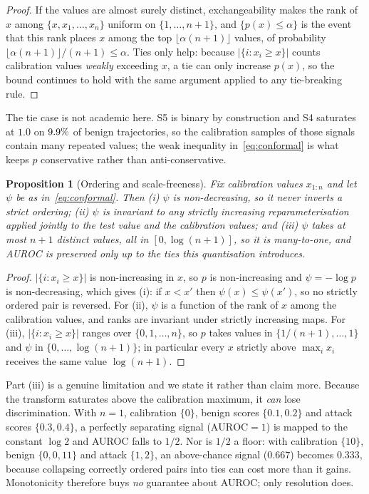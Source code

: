 \documentclass[pdflatex,sn-basic]{sn-jnl}%
\theoremstyle{thmstyleone}
\newtheorem{proposition}[theorem]{Proposition}
\theoremstyle{thmstyletwo}
\theoremstyle{thmstylethree}
\begin{document}
\begin{proof}
If the values are almost surely distinct, exchangeability makes the rank of $x$
among $\{x, x_1, \dots, x_n\}$ uniform on $\{1,\dots,n+1\}$, and
$\{p(x) \le \alpha\}$ is the event that this rank places $x$ among the top
$\lfloor \alpha (n+1) \rfloor$ values, of probability
$\lfloor \alpha(n+1)\rfloor/(n+1) \le \alpha$. Ties only help: because
$|\{i : x_i \ge x\}|$ counts calibration values \emph{weakly} exceeding $x$, a tie
can only increase $p(x)$, so the bound continues to hold with the same argument
applied to any tie-breaking rule.
\end{proof}

The tie case is not academic here. S5 is binary by construction and S4 saturates
at $1.0$ on $9.9\%$ of benign trajectories, so the calibration samples of those
signals contain many repeated values; the weak inequality in~\eqref{eq:conformal}
is what keeps $p$ conservative rather than anti-conservative.

\begin{proposition}[Ordering and scale-freeness]\label{prop:mono}
Fix calibration values $x_{1:n}$ and let $\psi$ be as in~\eqref{eq:conformal}.
Then (i) $\psi$ is non-decreasing, so it never inverts a strict ordering;
(ii) $\psi$ is invariant to any strictly increasing reparameterisation applied
jointly to the test value and the calibration values; and (iii) $\psi$ takes at most $n+1$ distinct values, all in
$[0, \log(n+1)]$, so it is many-to-one, and AUROC is preserved only up to the
ties this quantisation introduces.
\end{proposition}

\begin{proof}
$|\{i : x_i \ge x\}|$ is non-increasing in $x$, so $p$ is non-increasing and
$\psi = -\log p$ is non-decreasing, which gives (i): if $x < x'$ then
$\psi(x) \le \psi(x')$, so no strictly ordered pair is reversed.
For (ii), $\psi$ is a function of the rank of $x$ among the calibration values,
and ranks are invariant under strictly increasing maps. For (iii),
$|\{i : x_i \ge x\}|$ ranges over $\{0,1,\dots,n\}$, so $p$ takes values in
$\{1/(n{+}1), \dots, 1\}$ and $\psi$ in $\{0, \dots, \log(n{+}1)\}$; in
particular every $x$ strictly above $\max_i x_i$ receives the same value
$\log(n{+}1)$.
\end{proof}

Part (iii) is a genuine limitation and we state it rather than claim more.
Because the transform saturates above the calibration maximum, it \emph{can} lose
discrimination. With $n=1$, calibration $\{0\}$, benign scores $\{0.1, 0.2\}$ and
attack scores $\{0.3, 0.4\}$, a perfectly separating signal ($\mathrm{AUROC}=1$) is
mapped to the constant $\log 2$ and AUROC falls to $1/2$. Nor is $1/2$ a floor:
with calibration $\{10\}$, benign $\{0,0,11\}$ and attack $\{1,2\}$, an
above-chance signal ($0.667$) becomes $0.333$, because collapsing correctly
ordered pairs into ties can cost more than it gains. Monotonicity therefore buys
\emph{no} guarantee about AUROC; only resolution does.
\end{document}
